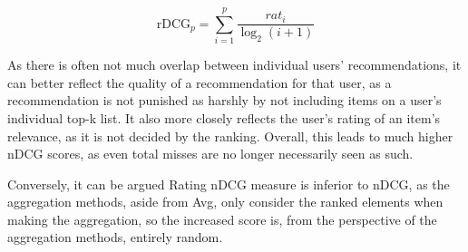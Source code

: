 \begin{equation}\label{eq:methodology_dcg_rating}
\text{rDCG}_p = \sum_{i=1}^{p}\frac{\textit{rat}_i}{\log_2(i + 1)}
\end{equation}

As there is often not much overlap between individual users' recommendations, it can better reflect the quality of a recommendation for that user, as a recommendation is not punished as harshly by not including items on a user's individual top-k list. It also more closely reflects the user's rating of an item's relevance, as it is not decided by the ranking. Overall, this leads to much higher nDCG scores, as even total misses are no longer necessarily seen as such.

Conversely, it can be argued Rating nDCG measure is inferior to nDCG, as the aggregation methods, aside from Avg, only consider the ranked elements when making the aggregation, so the increased score is, from the perspective of the aggregation methods, entirely random.